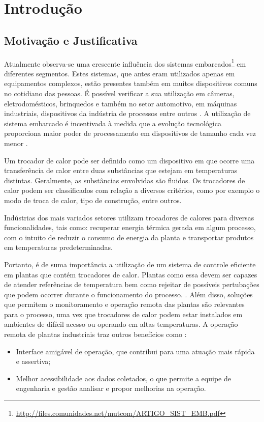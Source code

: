 \chapter{Introdução}
	\label{cap:introducao}
	
	\section{Motivação e Justificativa}
	
	Atualmente observa-se uma crescente influência dos sistemas embarcados\footnote{\url{http://files.comunidades.net/mutcom/ARTIGO_SIST_EMB.pdf}} em diferentes segmentos. Estes sistemas, que antes eram utilizados apenas em equipamentos complexos, estão presentes também em muitos dispositivos comuns no cotidiano das pessoas. É possível verificar a sua utilização em câmeras, eletrodomésticos, brinquedos e também no setor automotivo, em máquinas industriais, dispositivos da indústria de processos entre outros \cite{fabian2017,luiz2011}. A utilização de sistema embarcado é incentivada à medida que a evolução tecnológica proporciona maior poder de processamento em dispositivos de tamanho cada vez menor \cite{david2013}.

	Um trocador de calor pode ser definido como um dispositivo em que ocorre uma transferência de calor entre duas substâncias que estejam em temperaturas distintas. Geralmente, as substâncias envolvidas são fluidos. Os trocadores de calor podem ser classificados com relação a diversos critérios, como por exemplo o modo de troca de calor, tipo de construção, entre outros. \cite{kreith2011}
	
	Indústrias dos mais variados setores utilizam trocadores de calores para diversas funcionalidades, tais como: recuperar energia térmica gerada em algum processo, com o intuito de reduzir o consumo de energia da planta e transportar produtos em temperaturas predeterminadas.

	Portanto, é de suma importância a utilização de um sistema de controle eficiente em plantas que contém trocadores de calor. Plantas como essa devem ser capazes de atender referências de temperatura bem como rejeitar de possíveis pertubações que podem ocorrer durante o funcionamento do processo. \cite{novazzi2007}. Além disso, soluções que permitem o monitoramento e operação remota das plantas são relevantes para o processo, uma vez que trocadores de calor podem estar instalados em ambientes de difícil acesso ou operando em altas temperaturas. A operação remota de plantas industriais traz outros benefícios como \cite{babau2009}:
	\begin{itemize}
		\item 
		Interface amigável de operação, que contribui para uma atuação mais rápida e assertiva;
		\item 
		Melhor acessibilidade aos dados coletados, o que permite a equipe de engenharia e gestão analisar e propor melhorias na operação.
	\end{itemize}

